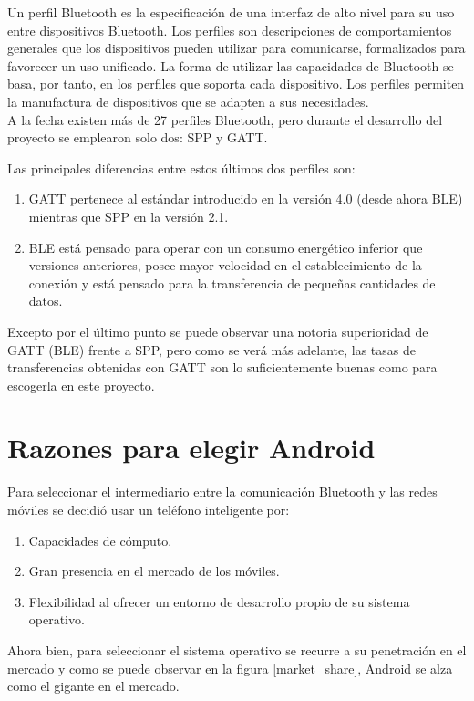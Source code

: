 Un perfil Bluetooth es la especificación de una interfaz de alto nivel para su uso entre dispositivos Bluetooth. 
Los perfiles son descripciones de comportamientos generales que los dispositivos pueden utilizar para comunicarse, formalizados para favorecer un uso unificado. La forma de utilizar las capacidades de Bluetooth se basa, por tanto, en los perfiles que soporta cada dispositivo. Los perfiles permiten la manufactura de dispositivos que se adapten a sus necesidades.\\

A la fecha existen más de 27 perfiles Bluetooth, pero durante el desarrollo del proyecto se emplearon solo dos: SPP y GATT.

Las principales diferencias entre estos últimos dos perfiles son: 
\begin{enumerate}
	\item GATT pertenece al estándar introducido en la versión 4.0 (desde ahora BLE) mientras que SPP en la versión 2.1. 
	\item BLE está pensado para operar con un consumo energético inferior que versiones anteriores, posee mayor velocidad en el establecimiento de la conexión y está pensado para la transferencia de pequeñas cantidades de datos. 
\end{enumerate}
Excepto por el último punto se puede observar una notoria superioridad de GATT (BLE) frente a SPP, pero como se verá más adelante, las tasas de transferencias obtenidas con GATT son lo suficientemente buenas como para escogerla en este proyecto.

\newpage
\section{Razones para elegir Android}

Para seleccionar el intermediario entre la comunicación Bluetooth y las redes móviles se decidió usar un teléfono inteligente por:
\begin{enumerate}
	\item Capacidades de cómputo.
	\item Gran presencia en el mercado de los móviles.
	\item Flexibilidad al ofrecer un entorno de desarrollo propio de su sistema operativo. 
\end{enumerate}
Ahora bien, para seleccionar el sistema operativo se recurre a su penetración en el mercado y como se puede observar en la figura \ref{market_share}, Android se alza como el gigante en el mercado.

